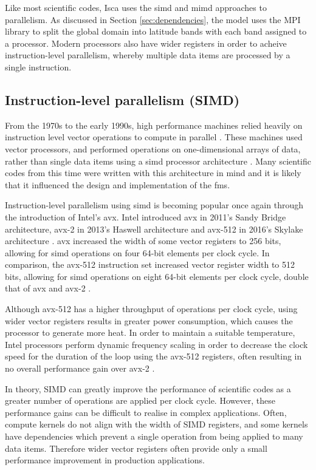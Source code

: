 \documentclass[a4paper,11pt]{report}
\begin{document}
\par
Like most scientific codes, Isca uses the \gls{simd} and \gls{mimd} approaches to parallelism. As discussed in Section \ref{sec:dependencies}, the model uses the MPI library to split the global domain into latitude bands with each band assigned to a processor. Modern processors also have wider registers in order to acheive instruction-level parallelism, whereby multiple data items are processed by a single instruction. 

\subsection{Instruction-level parallelism (SIMD)}
From the 1970s to the early 1990s, high performance machines relied heavily on instruction level vector operations to compute in parallel \cite{6877473}. These machines used vector processors, and performed operations on one-dimensional arrays of data, rather than single data items using a \gls{simd} processor architecture \cite{conte2000long}. Many scientific codes from this time were written with this architecture in mind and it is likely that it influenced the design and implementation of the \gls{fms}. 
\par
Instruction-level parallelism using \gls{simd} is becoming popular once again through the introduction of Intel's \gls{avx}. Intel introduced \gls{avx} in 2011's Sandy Bridge architecture, \gls{avx}-2 in 2013's Haswell architecture and \gls{avx}-512 in 2016's Skylake architecture \cite{chris2011avx, intel2019avx}. \gls{avx} increased the width of some vector registers to 256 bits, allowing for \gls{simd} operations on four 64-bit elements per clock cycle. In comparison, the \gls{avx}-512 instruction set increased vector register width to 512 bits, allowing for \gls{simd} operations on eight 64-bit elements per clock cycle, double that of \gls{avx} and \gls{avx}-2 \cite{chris2011avx,xeon2680v4}.
\par
Although \gls{avx}-512 has a higher throughput of operations per clock cycle, using wider vector registers results in greater power consumption, which causes the processor to generate more heat. In order to maintain a suitable temperature, Intel processors perform dynamic frequency scaling in order to decrease the clock speed for the duration of the loop using the \gls{avx}-512 registers, often resulting in no overall performance gain over \gls{avx}-2 \cite{gottschlag2018mechanism}.
\par
In theory, SIMD can greatly improve the performance of scientific codes as a greater number of operations are applied per clock cycle. However, these performance gains can be difficult to realise in complex applications. Often, compute kernels do not align with the width of SIMD registers, and some kernels have dependencies which prevent a single operation from being applied to many data items. Therefore wider vector registers often provide only a small performance improvement in production applications.
\end{document}
